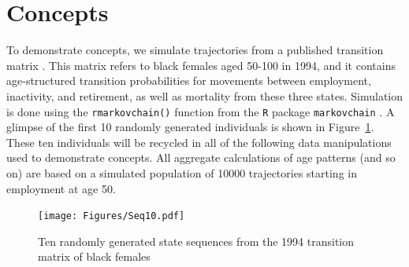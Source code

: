 \documentclass{article}
\begin{document}

\section{Concepts}
To demonstrate concepts, we simulate trajectories from a published transition matrix \citep{Dudel2017}. This matrix refers to black females aged 50-100 in 1994, and it contains age-structured transition probabilities for movements between employment, inactivity, and retirement, as well as mortality from these three states. Simulation is done using the \texttt{rmarkovchain()} function from the \texttt{R} package \texttt{markovchain} \citep{spedicato2017}. A glimpse of the first 10 randomly generated individuals is shown in Figure~\ref{fig:seq10}. These ten individuals will be recycled in all of the following data manipulations used to demonstrate concepts. All aggregate calculations of age patterns (and so on) are based on a simulated population of 10000 trajectories starting in employment at age 50.

\begin{figure}[ht!]
\centering
\caption{Ten randomly generated state sequences from the 1994 transition matrix
of black females \citep{Dudel2017}}
\label{fig:seq10}
\texttt{[image: Figures/Seq10.pdf]}
\end{figure}
\end{document}
